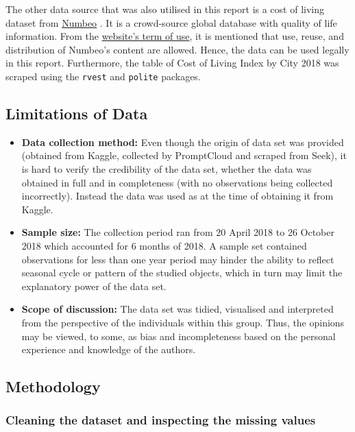\documentclass[11pt,a4paper,]{article}
\providecommand{\tightlist}{%
  \setlength{\itemsep}{0pt}\setlength{\parskip}{0pt}}
\begin{document}
The other data source that was also utilised in this report is a cost of living dataset from \href{https://www.numbeo.com/cost-of-living/rankings.jsp?title=2018}{Numbeo} \autocite{numbeo}. It is a crowd-source global database with quality of life information. From the \href{https://www.numbeo.com/common/terms_of_use.jsp}{website's term of use}, it is mentioned that use, reuse, and distribution of Numbeo's content are allowed. Hence, the data can be used legally in this report. Furthermore, the table of Cost of Living Index by City 2018 was scraped using the \texttt{rvest} and \texttt{polite} packages.

\hypertarget{limitations-of-data}{%
\subsection{Limitations of Data}\label{limitations-of-data}}

\begin{itemize}
\tightlist
\item
  \textbf{Data collection method:} Even though the origin of data set was provided (obtained from Kaggle, collected by PromptCloud and scraped from Seek), it is hard to verify the credibility of the data set, whether the data was obtained in full and in completeness (with no observations being collected incorrectly). Instead the data was used as at the time of obtaining it from Kaggle.
\item
  \textbf{Sample size:} The collection period ran from 20 April 2018 to 26 October 2018 which accounted for 6 months of 2018. A sample set contained observations for less than one year period may hinder the ability to reflect seasonal cycle or pattern of the studied objects, which in turn may limit the explanatory power of the data set.
\item
  \textbf{Scope of discussion:} The data set was tidied, visualised and interpreted from the perspective of the individuals within this group. Thus, the opinions may be viewed, to some, as bias and incompleteness based on the personal experience and knowledge of the authors.
\end{itemize}

\hypertarget{methodology}{%
\subsection{Methodology}\label{methodology}}

\hypertarget{cleaning-the-dataset-and-inspecting-the-missing-values}{%
\subsubsection{Cleaning the dataset and inspecting the missing values}\label{cleaning-the-dataset-and-inspecting-the-missing-values}}
\end{document}
